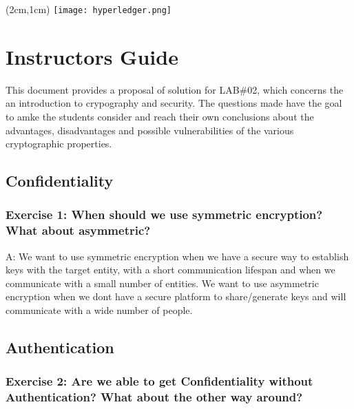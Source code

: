 \documentclass[12pt,a4paper]{article}
\begin{document}
\textblockorigin{-34pt}{-12pt}
\begin{textblock*}{10cm}(2cm,1cm)
\texttt{[image: hyperledger.png]}
\end{textblock*}

\section*{Instructors Guide}
This document provides a proposal of solution for LAB\#02, which concerns the an introduction to crypography and security. The questions made have the goal to amke the students consider and reach their own conclusions about the advantages, disadvantages and possible vulnerabilities of the various cryptographic properties.





\subsection*{Confidentiality}
\subsubsection*{Exercise 1: When should we use symmetric encryption? What about asymmetric?}

A: We want to use symmetric encryption when we have a secure way to establish keys with the target entity, with  a short communication lifespan and when we communicate with a small number of entities. 
We want to use asymmetric encryption when we dont have a secure platform to share/generate keys and will communicate with a wide number of people.

\subsection*{Authentication}
\subsubsection*{Exercise 2: Are we able to get Confidentiality without Authentication? What about the other way around?}
\end{document}
